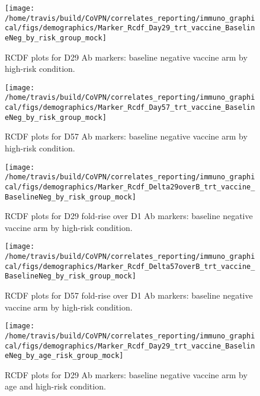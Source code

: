 \documentclass[]{book}
\theoremstyle{definition}
\theoremstyle{definition}
\theoremstyle{definition}
\newcommand{\1}{\mathbbm{1}}
\begin{document}
\begin{figure}[H]

{\centering \texttt{[image: /home/travis/build/CoVPN/correlates\_reporting/immuno\_graphical/figs/demographics/Marker\_Rcdf\_Day29\_trt\_vaccine\_BaselineNeg\_by\_risk\_group\_mock]} 

}

\caption{RCDF plots for D29 Ab markers: baseline negative vaccine arm by high-risk condition.}\label{fig:unnamed-chunk-59}
\end{figure}

\begin{figure}[H]

{\centering \texttt{[image: /home/travis/build/CoVPN/correlates\_reporting/immuno\_graphical/figs/demographics/Marker\_Rcdf\_Day57\_trt\_vaccine\_BaselineNeg\_by\_risk\_group\_mock]} 

}

\caption{RCDF plots for D57 Ab markers: baseline negative vaccine arm by high-risk condition.}\label{fig:unnamed-chunk-60}
\end{figure}

\begin{figure}[H]

{\centering \texttt{[image: /home/travis/build/CoVPN/correlates\_reporting/immuno\_graphical/figs/demographics/Marker\_Rcdf\_Delta29overB\_trt\_vaccine\_BaselineNeg\_by\_risk\_group\_mock]} 

}

\caption{RCDF plots for D29 fold-rise over D1 Ab markers: baseline negative vaccine arm by high-risk condition.}\label{fig:unnamed-chunk-61}
\end{figure}

\begin{figure}[H]

{\centering \texttt{[image: /home/travis/build/CoVPN/correlates\_reporting/immuno\_graphical/figs/demographics/Marker\_Rcdf\_Delta57overB\_trt\_vaccine\_BaselineNeg\_by\_risk\_group\_mock]} 

}

\caption{RCDF plots for D57 fold-rise over D1 Ab markers: baseline negative vaccine arm by high-risk condition.}\label{fig:unnamed-chunk-62}
\end{figure}

\begin{figure}[H]

{\centering \texttt{[image: /home/travis/build/CoVPN/correlates\_reporting/immuno\_graphical/figs/demographics/Marker\_Rcdf\_Day29\_trt\_vaccine\_BaselineNeg\_by\_age\_risk\_group\_mock]} 

}

\caption{RCDF plots for D29 Ab markers: baseline negative vaccine arm by age and high-risk condition.}\label{fig:unnamed-chunk-63}
\end{figure}
\end{document}
